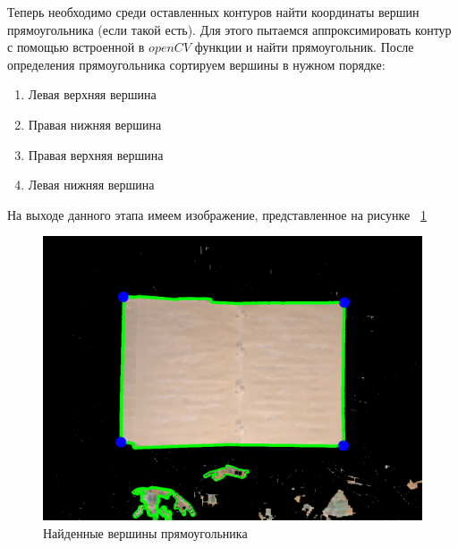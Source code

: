 Теперь необходимо среди оставленных контуров найти координаты вершин прямоугольника (если такой есть). Для этого пытаемся аппроксимировать контур с помощью встроенной в $openCV$ \cite{opencv_approx} функции и найти прямоугольник.
После определения прямоугольника сортируем вершины в нужном порядке:
\begin{enumerate}[arabic]
    \item Левая верхняя вершина
    \item Правая нижняя вершина
    \item Правая верхняя вершина
    \item Левая нижняя вершина
\end{enumerate}

На выходе данного этапа имеем изображение, представленное на рисунке ~\ref{corners}

\begin{figure}
    \includegraphics[scale=0.25]{img/corners}
    \caption{Найденные вершины прямоугольника}
    \label{corners}
\end{figure}

